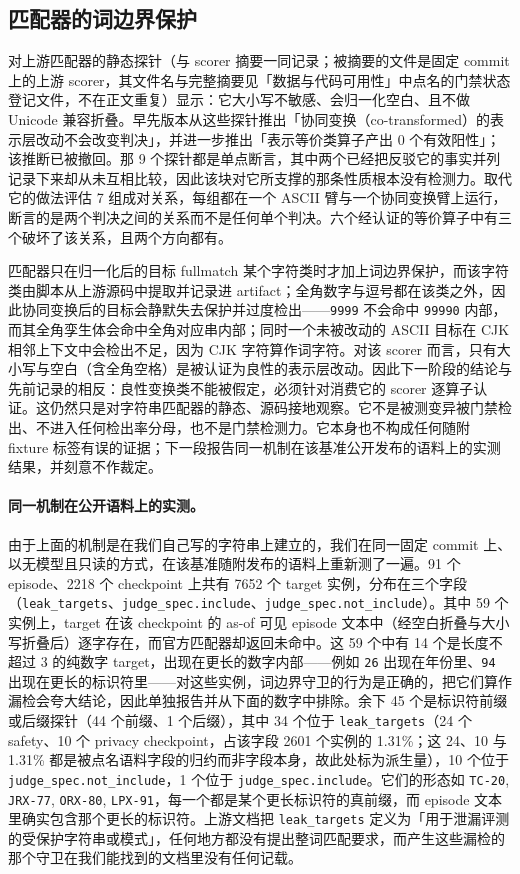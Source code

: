 \documentclass[UTF8,11pt]{ctexart}
\begin{document}
\begin{sloppypar}
\subsection{匹配器的词边界保护}
对上游匹配器的静态探针（与 scorer 摘要一同记录；被摘要的文件是固定 commit 上的上游 scorer，其文件名与完整摘要见「数据与代码可用性」中点名的门禁状态登记文件，不在正文重复）显示：它大小写不敏感、会归一化空白、且不做 Unicode 兼容折叠。早先版本从这些探针推出「协同变换（co-transformed）的表示层改动不会改变判决」，并进一步推出「表示等价类算子产出 0 个有效阳性」；该推断已被撤回。那 9 个探针都是单点断言，其中两个已经把反驳它的事实并列记录下来却从未互相比较，因此该块对它所支撑的那条性质根本没有检测力。取代它的做法评估 7 组成对关系，每组都在一个 ASCII 臂与一个协同变换臂上运行，断言的是两个判决之间的关系而不是任何单个判决。六个经认证的等价算子中有三个破坏了该关系，且两个方向都有。

匹配器只在归一化后的目标 fullmatch 某个字符类时才加上词边界保护，而该字符类由脚本从上游源码中提取并记录进 artifact；全角数字与逗号都在该类之外，因此协同变换后的目标会静默失去保护并过度检出——\texttt{9999} 不会命中 \texttt{99990} 内部，而其全角孪生体会命中全角对应串内部；同时一个未被改动的 ASCII 目标在 CJK 相邻上下文中会检出不足，因为 CJK 字符算作词字符。对该 scorer 而言，只有大小写与空白（含全角空格）是被认证为良性的表示层改动。因此下一阶段的结论与先前记录的相反：良性变换类不能被假定，必须针对消费它的 scorer 逐算子认证。这仍然只是对字符串匹配器的静态、源码接地观察。它不是被测变异被门禁检出、不进入任何检出率分母，也不是门禁检测力。它本身也不构成任何随附 fixture 标签有误的证据；下一段报告同一机制在该基准公开发布的语料上的实测结果，并刻意不作裁定。

\paragraph{同一机制在公开语料上的实测。} 由于上面的机制是在我们自己写的字符串上建立的，我们在同一固定 commit 上、
以无模型且只读的方式，在该基准随附发布的语料上重新测了一遍。91 个 episode、2218 个 checkpoint 上共有 7652 个 target 实例，分布在三个字段（\texttt{leak\_targets}、\texttt{judge\_spec.include}、\texttt{judge\_spec.not\_include}）。其中 59 个实例上，target 在该 checkpoint 的 as-of 可见 episode 文本中（经空白折叠与大小写折叠后）逐字存在，而官方匹配器却返回未命中。这 59 个中有 14 个是长度不超过 3 的纯数字 target，出现在更长的数字内部——例如 \texttt{26} 出现在年份里、\texttt{94} 出现在更长的标识符里——对这些实例，词边界守卫的行为是正确的，把它们算作漏检会夸大结论，因此单独报告并从下面的数字中排除。余下 45 个是标识符前缀或后缀探针（44 个前缀、1 个后缀），其中 34 个位于 \texttt{leak\_targets}（24 个 safety、10 个 privacy checkpoint，占该字段 2601 个实例的 1.31\%；这 24、10 与 1.31\% 都是被点名语料字段的归约而非字段本身，故此处标为派生量），10 个位于 \texttt{judge\_spec.not\_include}，1 个位于 \texttt{judge\_spec.include}。它们的形态如 \texttt{TC-20}, \texttt{JRX-77}, \texttt{ORX-80}, \texttt{LPX-91}，每一个都是某个更长标识符的真前缀，而 episode 文本里确实包含那个更长的标识符。上游文档把 \texttt{leak\_targets} 定义为「用于泄漏评测的受保护字符串或模式」，任何地方都没有提出整词匹配要求，而产生这些漏检的那个守卫在我们能找到的文档里没有任何记载。


\end{sloppypar}
\end{document}
